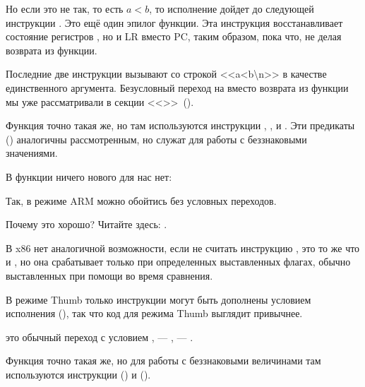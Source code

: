 Но если это не так, то есть $a<b$, то исполнение дойдет до следующей инструкции 
. Это ещё один эпилог функции. Эта инструкция восстанавливает состояние регистров
, но и \ac{LR} вместо \ac{PC}, таким образом, пока что, не делая возврата из функции.

Последние две инструкции вызывают \printf 
со строкой <<a<b\textbackslash{}n>> в качестве единственного аргумента.
Безусловный переход на \printf вместо возврата из функции мы уже рассматривали в секции
 <<\PrintfSeveralArgumentsSectionName>>~().

Функция  точно такая же, но там используются инструкции , , и . Эти предикаты
()
аналогичны рассмотренным, но служат для работы с беззнаковыми значениями.

В функции \main ничего нового для нас нет:



Так, в режиме ARM можно обойтись без условных переходов.

Почему это хорошо? Читайте здесь: .

В x86 нет аналогичной возможности, если не считать инструкцию , это то же что и \MOV, 
но она срабатывает только при определенных выставленных флагах, обычно выставленных при помощи \CMP во время сравнения.

\mysubparagraph{\OptimizingKeilVI (\ThumbMode)}



В режиме Thumb только инструкции  могут быть дополнены условием исполнения (), 
так что код для режима Thumb выглядит привычнее.

 это обычный переход с условием , 
 --- , 
 --- .

Функция  точно такая же, но для работы с беззнаковыми величинами 
там используются инструкции  
() и  ().
